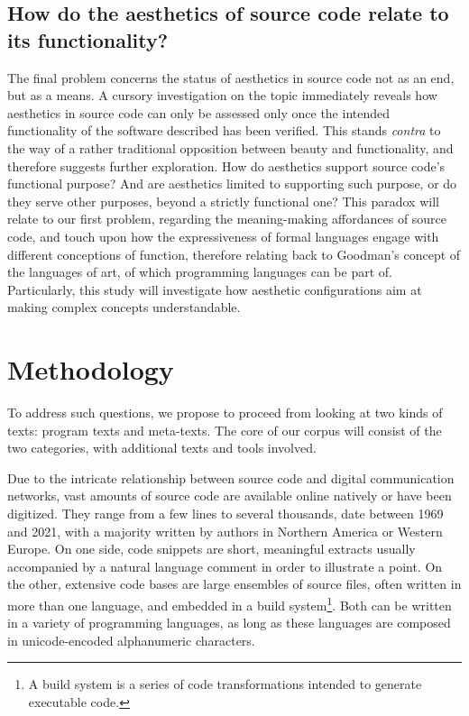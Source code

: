 \subsection{How do the aesthetics of source code relate to its functionality?}
\label{subsec:research-question-3}

The final problem concerns the status of aesthetics in source code not as an end, but as a means. A cursory investigation on the topic immediately reveals how aesthetics in source code can only be assessed only once the intended functionality of the software described has been verified. This stands \emph{contra} to the way of a rather traditional opposition between beauty and functionality, and therefore suggests further exploration. How do aesthetics support source code's functional purpose? And are aesthetics limited to supporting such purpose, or do they serve other purposes, beyond a strictly functional one? This paradox will relate to our first problem, regarding the meaning-making affordances of source code, and touch upon how the expressiveness of formal languages engage with different conceptions of function, therefore relating back to Goodman's concept of the languages of art, of which programming languages can be part of. Particularly, this study will investigate how aesthetic configurations aim at making complex concepts understandable.

\section{Methodology}
\label{sec:methodology}

To address such questions, we propose to proceed from looking at two kinds of texts: program texts and meta-texts. The core of our corpus will consist of the two categories, with additional texts and tools involved.

Due to the intricate relationship between source code and digital communication networks, vast amounts of source code are available online natively or have been digitized. They range from a few lines to several thousands, date between 1969 and 2021, with a majority written by authors in Northern America or Western Europe. On one side, code snippets are short, meaningful extracts usually accompanied by a natural language comment in order to illustrate a point. On the other, extensive code bases are large ensembles of source files, often written in more than one language, and embedded in a build system\footnote{A build system is a series of code transformations intended to generate executable code.}. Both can be written in a variety of programming languages, as long as these languages are composed in unicode-encoded alphanumeric characters.

